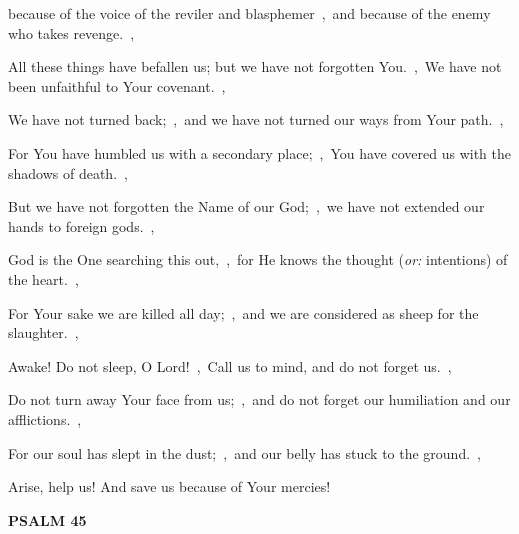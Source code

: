 \documentclass[12pt,twoside,a5paper]{article}
\newcommand{\psalm}[1]{\textbf{PSALM {#1}}\nopagebreak}
\newcommand{\translationoption}[1]{\emph{or:} #1}
\begin{document}
\begin{normalparskip}
  because of the voice of the reviler and blasphemer~\sep\ and because of the enemy who takes revenge.~\sep

  All these things have befallen us; but we have not forgotten You.~\sep\ We have not been unfaithful to Your covenant.~\sep

  We have not turned back;~\sep\ and we have not turned our ways from Your path.~\sep

  For You have humbled us with a secondary place;~\sep\ You have covered us with the shadows of death.~\sep

  But we have not forgotten the Name of our God;~\sep\ we have not extended our hands to foreign gods.~\sep

  God is the One searching this out,~\sep\ for He knows the thought (\translationoption{intentions}) of the heart.~\sep

  For Your sake we are killed all day;~\sep\ and we are considered as sheep for the slaughter.~\sep

  Awake! Do not sleep, O Lord!~\sep\ Call us to mind, and do not forget us.~\sep

  Do not turn away Your face from us;~\sep\ and do not forget our humiliation and our afflictions.~\sep

  For our soul has slept in the dust;~\sep\ and our belly has stuck to the ground.~\sep

  Arise, help us! And save us because of Your mercies!
\end{normalparskip}

\psalm{45}
\end{document}
